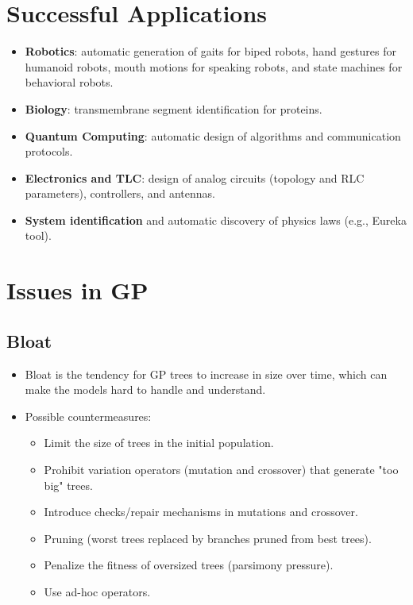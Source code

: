 \section{Successful Applications}
\begin{itemize}
    \item \textbf{Robotics}: automatic generation of gaits for biped robots, hand gestures for humanoid robots, mouth motions for speaking robots, and state machines for behavioral robots.
   \item \textbf{Biology}: transmembrane segment identification for proteins.
    \item \textbf{Quantum Computing}: automatic design of algorithms and communication protocols.
    \item \textbf{Electronics and TLC}: design of analog circuits (topology and RLC parameters), controllers, and antennas.
   \item\textbf{System identification} and automatic discovery of physics laws (e.g., Eureka tool).
\end{itemize}

\section{Issues in GP}

\subsection*{Bloat}
\begin{itemize}
    \item  Bloat is the tendency for GP trees to increase in size over time, which can make the models hard to handle and understand.
     \item  Possible countermeasures:
        \begin{itemize}
            \item Limit the size of trees in the initial population.
             \item Prohibit variation operators (mutation and crossover) that generate "too big" trees.
            \item Introduce checks/repair mechanisms in mutations and crossover.
            \item Pruning (worst trees replaced by branches pruned from best trees).
            \item Penalize the fitness of oversized trees (parsimony pressure).
            \item Use ad-hoc operators.
        \end{itemize}
\end{itemize}

